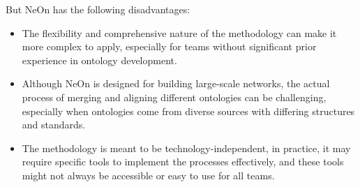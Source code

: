 But NeOn has the following disadvantages:
\begin{itemize}
    \item The flexibility and comprehensive nature of the methodology can make it more complex to apply, especially for teams without significant prior experience in ontology development. 

    \item Although NeOn is designed for building large-scale networks, the actual process of merging and aligning different ontologies can be challenging, especially when ontologies come from diverse sources with differing structures and standards.

    \item The methodology is meant to be technology-independent, in practice, it may require specific tools to implement the processes effectively, and these tools might not always be accessible or easy to use for all teams.
\end{itemize}

